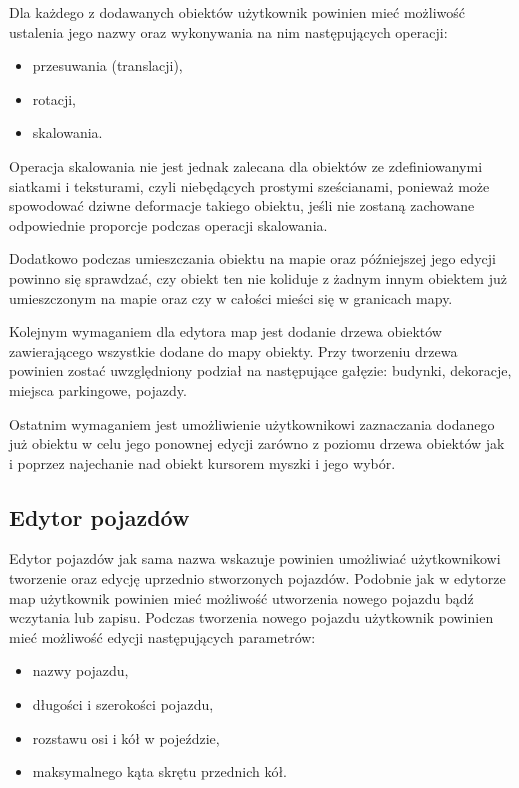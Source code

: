 \documentclass[a4paper,11pt,twoside]{report}
\theoremstyle{definition}
\begin{document}
Dla każdego z dodawanych obiektów użytkownik powinien mieć możliwość ustalenia jego nazwy oraz wykonywania na nim następujących operacji:
\begin{itemize}
	\item przesuwania (translacji),
	\item rotacji,
	\item skalowania.
\end{itemize}

Operacja skalowania nie jest jednak zalecana dla obiektów ze zdefiniowanymi siatkami i teksturami, czyli niebędących prostymi sześcianami, ponieważ może spowodować dziwne deformacje takiego obiektu, jeśli nie zostaną zachowane odpowiednie proporcje podczas operacji skalowania.

Dodatkowo podczas umieszczania obiektu na mapie oraz późniejszej jego edycji powinno się sprawdzać, czy obiekt ten nie koliduje z żadnym innym obiektem już umieszczonym na mapie oraz czy w całości mieści się w granicach mapy.

Kolejnym wymaganiem dla edytora map jest dodanie drzewa obiektów zawierającego wszystkie dodane do mapy obiekty. Przy tworzeniu drzewa powinien zostać uwzględniony podział na następujące gałęzie: budynki, dekoracje, miejsca parkingowe, pojazdy.

Ostatnim wymaganiem jest umożliwienie użytkownikowi zaznaczania dodanego już obiektu w celu jego ponownej edycji zarówno z poziomu drzewa obiektów jak i poprzez najechanie nad obiekt kursorem myszki i jego wybór. 

\subsection{Edytor pojazdów}

Edytor pojazdów jak sama nazwa wskazuje powinien umożliwiać użytkownikowi tworzenie oraz edycję uprzednio stworzonych pojazdów. Podobnie jak w edytorze map użytkownik powinien mieć możliwość utworzenia nowego pojazdu bądź wczytania lub zapisu. Podczas tworzenia nowego pojazdu użytkownik powinien mieć możliwość edycji następujących parametrów:
\begin{itemize}
	\item nazwy pojazdu,
	\item długości i szerokości pojazdu,
	\item rozstawu osi i kół w pojeździe,
	\item maksymalnego kąta skrętu przednich kół.
\end{itemize}
\end{document}
